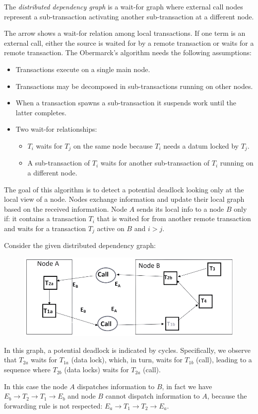 \begin{definition}
    The \emph{distributed dependency graph} is a wait-for graph where external call nodes represent a sub-transaction activating another sub-transaction at a different node. 
\end{definition}
The arrow shows a wait-for relation among local transactions. 
If one term is an external call, either the source is waited for by a remote transaction or waits for a remote transaction. 
The Obermarck's algorithm needs the following assumptions: 
\begin{itemize}
    \item Transactions execute on a single main node. 
    \item Transactions may be decomposed in sub-transactions running on other nodes. 
    \item When a transaction spawns a sub-transaction it suspends work until the latter completes. 
    \item Two wait-for relationships:
        \begin{itemize}
            \item $T_i$ waits for $T_j$ on the same node because $T_i$ needs a datum locked by $T_j$. 
            \item A sub-transaction of $T_i$ waits for another sub-transaction of $T_i$ running on a different node. 
        \end{itemize}
\end{itemize}
The goal of this algorithm is to detect a potential deadlock looking only at the local view of a node. 
Nodes exchange information and update their local graph based on the received information. 
Node $A$ sends its local info to a node $B$ only if: it contains a transaction $T_i$ that is waited for from another remote transaction and waits for a transaction $T_j$ active on $B$ and $i>j$.
\begin{example}
    Consider the given distributed dependency graph:
    \begin{figure}[H]
        \centering
        \includegraphics[width=0.5\linewidth]{images/distributedgraph.png}
    \end{figure}
    In this graph, a potential deadlock is indicated by cycles.
    Specifically, we observe that $T_{2a}$ waits for $T_{1a}$ (data lock), which, in turn, waits for $T_{1b}$ (call), leading to a sequence where $T_{2b}$ (data locks) waits for $T_{2a}$ (call).
    
    In this case the node $A$ dispatches information to $B$, in fact we have $ E_b \rightarrow T_2 \rightarrow T_1 \rightarrow E_b$ and node $B$ cannot dispatch information to $A$, because the forwarding rule is not respected: $E_a \rightarrow T_1 \rightarrow T_2 \rightarrow E_a$. 
\end{example}
